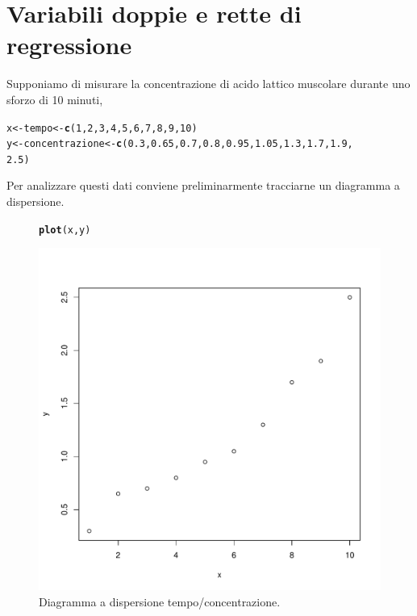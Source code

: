\documentclass[onecolumn,12pt]{book}\usepackage[]{graphicx}\usepackage[]{color}
\makeatletter
\def\maxwidth{ %
  \ifdim\Gin@nat@width>\linewidth
    \linewidth
  \else
    \Gin@nat@width
  \fi
}
\newcommand{\hlnum}[1]{\textcolor[rgb]{0.686,0.059,0.569}{#1}}%
\newcommand{\hlstd}[1]{\textcolor[rgb]{0.345,0.345,0.345}{#1}}%
\newcommand{\hlkwb}[1]{\textcolor[rgb]{0.69,0.353,0.396}{#1}}%
\newcommand{\hlkwd}[1]{\textcolor[rgb]{0.737,0.353,0.396}{\textbf{#1}}}%
\newenvironment{kframe}{%
 \def\at@end@of@kframe{}%
 \ifinner\ifhmode%
  \def\at@end@of@kframe{\end{minipage}}%
  \begin{minipage}{\columnwidth}%
 \fi\fi%
 \def\FrameCommand##1{\hskip\@totalleftmargin \hskip-\fboxsep
 \colorbox{shadecolor}{##1}\hskip-\fboxsep
     \hskip-\linewidth \hskip-\@totalleftmargin \hskip\columnwidth}%
 \MakeFramed {\advance\hsize-\width
   \@totalleftmargin\z@ \linewidth\hsize
   \@setminipage}}%
 {\par\unskip\endMakeFramed%
 \at@end@of@kframe}
\newenvironment{knitrout}{}{} %
\makeatother
\begin{document}
\section{Variabili doppie e rette di regressione}
Supponiamo di misurare la concentrazione di acido lattico muscolare durante uno sforzo di 10 minuti,
\begin{knitrout}
\color{fgcolor}\begin{kframe}
\begin{alltt}
\hlstd{x}\hlkwb{<-}\hlstd{tempo}\hlkwb{<-}\hlkwd{c}\hlstd{(}\hlnum{1}\hlstd{,}\hlnum{2}\hlstd{,}\hlnum{3}\hlstd{,}\hlnum{4}\hlstd{,}\hlnum{5}\hlstd{,}\hlnum{6}\hlstd{,}\hlnum{7}\hlstd{,}\hlnum{8}\hlstd{,}\hlnum{9}\hlstd{,}\hlnum{10}\hlstd{)}
\hlstd{y}\hlkwb{<-}\hlstd{concentrazione}\hlkwb{<-}\hlkwd{c}\hlstd{(}\hlnum{0.3}\hlstd{,}\hlnum{0.65}\hlstd{,}\hlnum{0.7}\hlstd{,}\hlnum{0.8}\hlstd{,}\hlnum{0.95}\hlstd{,}\hlnum{1.05}\hlstd{,}\hlnum{1.3}\hlstd{,}\hlnum{1.7}\hlstd{,}\hlnum{1.9}\hlstd{,}
\hlnum{2.5}\hlstd{)}
\end{alltt}
\end{kframe}
\end{knitrout}
Per analizzare questi dati conviene preliminarmente tracciarne un diagramma a dispersione.
\begin{figure}[htbp]
\begin{center}
\begin{knitrout}
\color{fgcolor}\begin{kframe}
\begin{alltt}
\hlkwd{plot}\hlstd{(x,y)}
\end{alltt}
\end{kframe}
\includegraphics[width=\maxwidth]{figure/unnamed-chunk-114-1} 

\end{knitrout}
\caption{Diagramma a dispersione tempo/concentrazione.}
\label{fig:scatte}
\end{center}
\end{figure}
\end{document}
